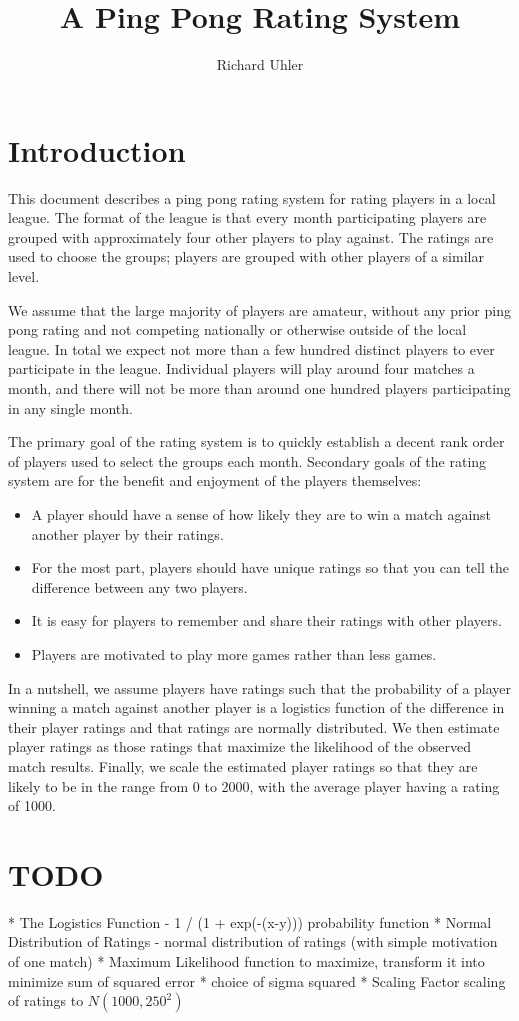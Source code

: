 \documentclass{article}
\begin{document}
\title{A Ping Pong Rating System}
\author{Richard Uhler}
\maketitle

\section{Introduction}
This document describes a ping pong rating system for rating players in a
local league. The format of the league is that every month participating
players are grouped with approximately four other players to play against. The
ratings are used to choose the groups; players are grouped with other players
of a similar level.

We assume that the large majority of players are amateur, without any prior
ping pong rating and not competing nationally or otherwise outside of the
local league. In total we expect not more than a few hundred distinct players
to ever participate in the league. Individual players will play around four
matches a month, and there will not be more than around one hundred players
participating in any single month.

The primary goal of the rating system is to quickly establish a decent rank
order of players used to select the groups each month. Secondary goals of the
rating system are for the benefit and enjoyment of the players themselves:
\begin{itemize}
  \item A player should have a sense of how likely they are to win a match
    against another player by their ratings.
  \item For the most part, players should have unique ratings so that you can
    tell the difference between any two players.
  \item It is easy for players to remember and share their ratings with other
    players.
  \item Players are motivated to play more games rather than less games.
\end{itemize}

In a nutshell, we assume players have ratings such that the probability
of a player winning a match against another player is a logistics function of
the difference in their player ratings and that ratings are normally
distributed. We then estimate player ratings as those ratings that maximize
the likelihood of the observed match results. Finally, we scale the estimated
player ratings so that they are likely to be in the range from 0 to 2000, with
the average player having a rating of 1000.

\section{TODO}
* The Logistics Function - 1 / (1 + exp(-(x-y))) probability function
* Normal Distribution of Ratings - normal distribution of ratings (with simple motivation of one match)
* Maximum Likelihood function to maximize, transform it into minimize sum of squared error
* choice of sigma squared
* Scaling Factor scaling of ratings to $N(1000, 250^2)$
\end{document}
